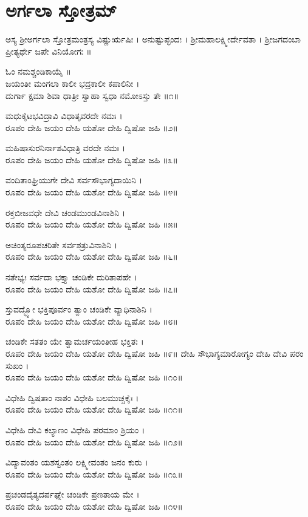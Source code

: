 \section{ಅರ್ಗಲಾ ಸ್ತೋತ್ರಮ್}
ಅಸ್ಯ ಶ್ರೀಅರ್ಗಲಾ ಸ್ತೋತ್ರಮಂತ್ರಸ್ಯ ವಿಷ್ಣುರ್ಋಷಿಃ । ಅನುಷ್ಟುಪ್ಛಂದಃ ।  ಶ್ರೀಮಹಾಲಕ್ಷ್ಮೀರ್ದೇವತಾ ।  ಶ್ರೀಜಗದಂಬಾ ಪ್ರೀತ್ಯರ್ಥೇ ಜಪೇ ವಿನಿಯೋಗಃ ॥

ಓಂ ನಮಶ್ಚಂಡಿಕಾಯೈ ॥\\
ಜಯಂತೀ ಮಂಗಲಾ ಕಾಲೀ ಭದ್ರಕಾಲೀ ಕಪಾಲಿನೀ ।\\
ದುರ್ಗಾ ಕ್ಷಮಾ ಶಿವಾ ಧಾತ್ರೀ ಸ್ವಾಹಾ ಸ್ವಧಾ ನಮೋಽಸ್ತು ತೇ ॥೧॥

ಮಧುಕೈಟಭವಿದ್ರಾವಿ ವಿಧಾತೃವರದೇ ನಮಃ ।\\
ರೂಪಂ ದೇಹಿ ಜಯಂ ದೇಹಿ ಯಶೋ ದೇಹಿ ದ್ವಿಷೋ ಜಹಿ ॥೨॥

ಮಹಿಷಾಸುರನಿರ್ನಾಶವಿಧಾತ್ರಿ ವರದೇ ನಮಃ ।\\
ರೂಪಂ ದೇಹಿ ಜಯಂ ದೇಹಿ ಯಶೋ ದೇಹಿ ದ್ವಿಷೋ ಜಹಿ ॥೩॥

ವಂದಿತಾಂಘ್ರಿಯುಗೇ ದೇವಿ ಸರ್ವಸೌಭಾಗ್ಯದಾಯಿನಿ ।\\
ರೂಪಂ ದೇಹಿ ಜಯಂ ದೇಹಿ ಯಶೋ ದೇಹಿ ದ್ವಿಷೋ ಜಹಿ ॥೪॥

ರಕ್ತಬೀಜವಧೇ ದೇವಿ ಚಂಡಮುಂಡವಿನಾಶಿನಿ ।\\
ರೂಪಂ ದೇಹಿ ಜಯಂ ದೇಹಿ ಯಶೋ ದೇಹಿ ದ್ವಿಷೋ ಜಹಿ ॥೫॥

ಅಚಿಂತ್ಯರೂಪಚರಿತೇ ಸರ್ವಶತ್ರುವಿನಾಶಿನಿ ।\\
ರೂಪಂ ದೇಹಿ ಜಯಂ ದೇಹಿ ಯಶೋ ದೇಹಿ ದ್ವಿಷೋ ಜಹಿ ॥೬॥

ನತೇಭ್ಯಃ ಸರ್ವದಾ ಭಕ್ತ್ಯಾ ಚಂಡಿಕೇ ದುರಿತಾಪಹೇ ।\\
ರೂಪಂ ದೇಹಿ ಜಯಂ ದೇಹಿ ಯಶೋ ದೇಹಿ ದ್ವಿಷೋ ಜಹಿ ॥೭॥

ಸ್ತುವದ್ಭ್ಯೋ ಭಕ್ತಿಪೂರ್ವಂ ತ್ವಾಂ ಚಂಡಿಕೇ ವ್ಯಾಧಿನಾಶಿನಿ ।\\
ರೂಪಂ ದೇಹಿ ಜಯಂ ದೇಹಿ ಯಶೋ ದೇಹಿ ದ್ವಿಷೋ ಜಹಿ ॥೮॥

ಚಂಡಿಕೇ ಸತತಂ ಯೇ ತ್ವಾಮರ್ಚಯಂತೀಹ ಭಕ್ತಿತಃ ।\\
ರೂಪಂ ದೇಹಿ ಜಯಂ ದೇಹಿ ಯಶೋ ದೇಹಿ ದ್ವಿಷೋ ಜಹಿ ॥೯॥
\newpage
ದೇಹಿ ಸೌಭಾಗ್ಯಮಾರೋಗ್ಯಂ ದೇಹಿ ದೇವಿ ಪರಂ ಸುಖಂ ।\\
ರೂಪಂ ದೇಹಿ ಜಯಂ ದೇಹಿ ಯಶೋ ದೇಹಿ ದ್ವಿಷೋ ಜಹಿ ॥೧೦॥

ವಿಧೇಹಿ ದ್ವಿಷತಾಂ ನಾಶಂ ವಿಧೇಹಿ ಬಲಮುಚ್ಚಕೈಃ ।\\
ರೂಪಂ ದೇಹಿ ಜಯಂ ದೇಹಿ ಯಶೋ ದೇಹಿ ದ್ವಿಷೋ ಜಹಿ ॥೧೧॥

ವಿಧೇಹಿ ದೇವಿ ಕಲ್ಯಾಣಂ ವಿಧೇಹಿ ಪರಮಾಂ ಶ್ರಿಯಂ ।\\
ರೂಪಂ ದೇಹಿ ಜಯಂ ದೇಹಿ ಯಶೋ ದೇಹಿ ದ್ವಿಷೋ ಜಹಿ ॥೧೨॥

ವಿದ್ಯಾವಂತಂ ಯಶಸ್ವಂತಂ ಲಕ್ಷ್ಮೀವಂತಂ ಜನಂ ಕುರು ।\\
ರೂಪಂ ದೇಹಿ ಜಯಂ ದೇಹಿ ಯಶೋ ದೇಹಿ ದ್ವಿಷೋ ಜಹಿ ॥೧೩॥

ಪ್ರಚಂಡದೈತ್ಯದರ್ಪಘ್ನೇ ಚಂಡಿಕೇ ಪ್ರಣತಾಯ ಮೇ ।\\
ರೂಪಂ ದೇಹಿ ಜಯಂ ದೇಹಿ ಯಶೋ ದೇಹಿ ದ್ವಿಷೋ ಜಹಿ ॥೧೪॥

